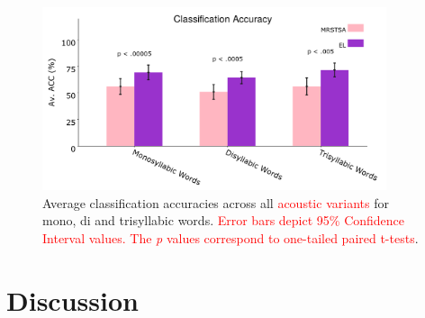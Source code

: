 \documentclass[10pt,letterpaper]{article}
\begin{document}
\begin{figure}[h!]
    \centering
    \includegraphics[width=0.9\textwidth]{PLOT1.png}
    \caption{Average classification accuracies across all \textcolor{red}{acoustic variants} for mono, di and trisyllabic words. \textcolor{red}{Error bars depict 95\% Confidence Interval values. The \emph{p} values correspond to one-tailed paired t-tests}.}
    \label{fig:AV_ACC}
\end{figure}














\section*{Discussion}
\end{document}
